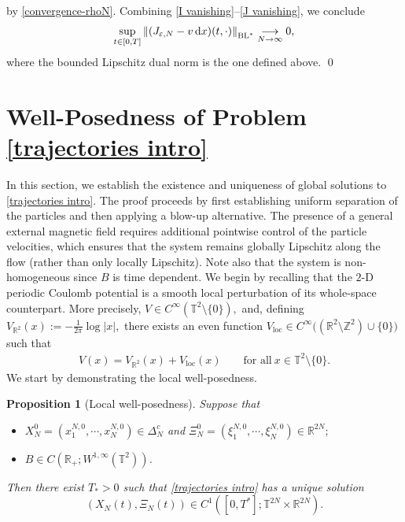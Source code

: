 \documentclass[11pt,reqno]{amsart}
\newtheorem{prop}[thm]{Proposition}
\numberwithin{equation}{section}
\def\dd{{\rm d}}
\begin{document}
by \eqref{convergence-rhoN}. 
Combining \eqref{I vanishing}--\eqref{J vanishing}, we conclude 
\begin{align*}
\underset{t\in [0,T]}{\sup}\left\Vert (J_{\varepsilon,N}-v\,\dd x)(t,\cdot)\right\Vert_{\mathrm{BL}^{*}}\underset{N\rightarrow \infty}{\longrightarrow} 0,
\end{align*}
where the bounded Lipschitz dual norm is the one defined above.
\qed


\section{Well-Posedness of Problem \eqref{trajectories intro}}
\label{wellposed-trajectories-sec}
In this section, we establish the existence and uniqueness of global solutions to \eqref{trajectories intro}. The proof proceeds by first establishing uniform separation of the particles and then applying a blow-up alternative. The presence of a general external magnetic field requires additional pointwise control of the particle velocities, which ensures that the system remains globally Lipschitz along the flow (rather than only locally Lipschitz). Note also that the system is non-homogeneous since $B$ is time dependent. 
We begin by recalling that the $2$-D periodic Coulomb potential is a smooth local perturbation of its whole-space counterpart. More precisely,
$
V\in C^\infty(\mathbb T^2\setminus\{0\}),
$
and, defining
$
V_{\mathbb R^2}(x):=-\frac{1}{2\pi}\log|x|,
$
there exists an even function
$
V_{\mathrm{loc}}\in C^\infty\big((\mathbb R^2\setminus\mathbb Z^2)\cup\{0\}\big)
$
such that
\begin{align*}
V(x)
=V_{\mathbb{R}^{2}}(x)+V_{\mathrm{loc}}(x) \qquad \mbox{for all}\ x\in \mathbb{T}^{2}\setminus \{0\}.     
\end{align*}
We start by demonstrating the local well-posedness. 

\begin{prop}[Local well-posedness]\label{Short time well posed}
Suppose that
\begin{itemize}
\item[{\rm(i)}]$X_{N}^{0}=(x_{1}^{N,0},\cdots\!,x_{N}^{N,0})\in \Delta_{N}^{c}$ and $\Xi_{N}^{0}=(\xi_{1}^{N,0},\cdots\!,\xi_{N}^{N,0})\in \mathbb{R}^{2N};$
\smallskip
\item[{\rm(ii)}] $B\in C(\mathbb{R}_{+};W^{1,\infty}(\mathbb{T}^{2}))$. 
\end{itemize}
Then there exist $T_{\ast}>0$ such that \eqref{trajectories intro} 
has a unique solution 
$$
(X_{N}(t),\Xi_{N}(t))\in C^{1}([0,T^{\ast}];\mathbb{T}^{2N}\times \mathbb{R}^{2N}).
$$ 
\end{prop}
\end{document}
